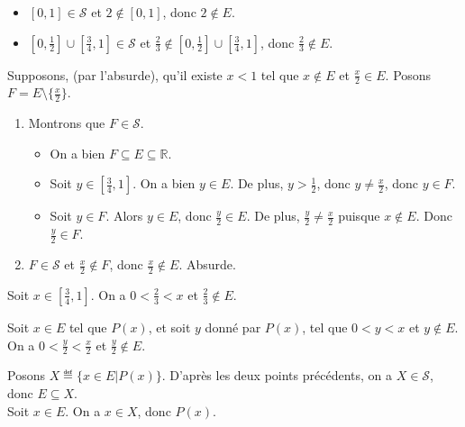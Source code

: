 \begin{corrections}
\begin{questions}
    \begin{itemize}
    \item $[0,1] \in \mathcal{S}$ et $2\notin [0,1]$, donc $2 \notin E$. 
    \item $[0, \frac{1}{2}] \cup [\frac{3}{4} , 1] \in \mathcal{S}$ et $\frac{2}{3}\notin [0, \frac{1}{2}] \cup [\frac{3}{4} , 1]$, donc $\frac{2}{3} \notin E$. 
    \end{itemize}
  \item Supposons, (par l'absurde), qu'il existe $x<1$ tel que $x\notin E$ et $\frac{x}{2} \in E$.
    Posons $F = E \setminus \{\frac{x}{2}\}$.  
    \begin{enumerate}
    \item Montrons que $F \in \mathcal{S}$. 
      \begin{itemize}
      \item On a bien $F \subseteq E \subseteq \mathbb{R}$.
      \item Soit $y \in [\frac{3}{4}, 1]$. On a bien $y\in E$. De plus, $y > \frac{1}{2}$, donc $y \neq \frac{x}{2}$, donc $y\in F$. 
      \item Soit $y \in F$. Alors $y\in E$, donc $\frac{y}{2} \in E$. De plus, $\frac{y}{2} \neq \frac{x}{2}$ puisque $x\notin E$. Donc $\frac{y}{2}\in F$. 
      \end{itemize}
    \item $F \in \mathcal{S}$ et $\frac{x}{2} \notin F$, donc $\frac{x}{2} \notin E$. Absurde. 
    \end{enumerate}
  \item Soit $x \in \left[\frac{3}{4}, 1\right]$. On a $0 < \frac{2}{3} < x$ et $\frac{2}{3} \notin E$. 
  \item Soit $x \in E$ tel que $P(x)$, et soit $y$ donné par $P(x)$, tel que $0 < y < x$ et $y\notin E$.
    On a $0 < \frac{y}{2} < \frac{x}{2}$ et $\frac{y}{2}\notin E$. 
  \item Posons $X \eqdef \{x\in E | P(x)\}$. D'après les deux points précédents,
    on a $X\in \mathcal{S}$, donc $E \subseteq X$. \\
    Soit $x \in E$. On a $x\in X$, donc $P(x)$.  
  \end{questions}

\end{corrections}

\endgroup
\endinput
